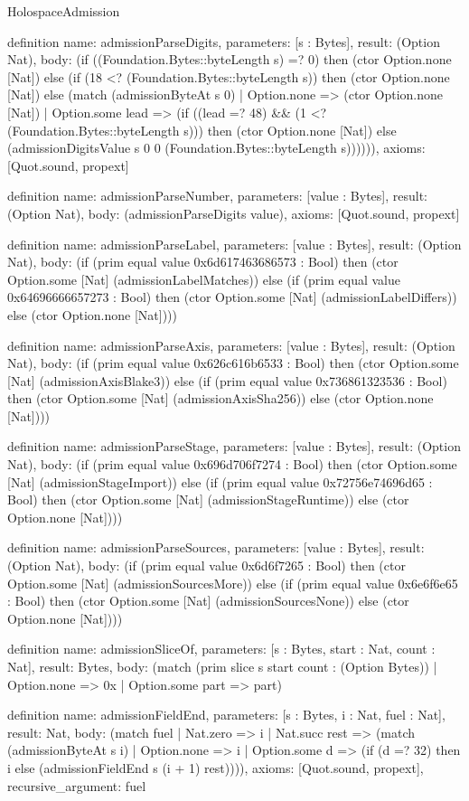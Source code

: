 \begin{lexlean}{HolospaceAdmission}
\begin{semanticmodule}
definition{
  name: admissionParseDigits,
  parameters: [s : Bytes],
  result: (Option Nat),
  body: (if ((Foundation.Bytes::byteLength s) =? 0) then (ctor Option.none [Nat]) else (if (18 <? (Foundation.Bytes::byteLength s)) then (ctor Option.none [Nat]) else (match (admissionByteAt s 0)
    | Option.none => (ctor Option.none [Nat])
    | Option.some lead => (if ((lead =? 48) && (1 <? (Foundation.Bytes::byteLength s))) then (ctor Option.none [Nat]) else (admissionDigitsValue s 0 0 (Foundation.Bytes::byteLength s)))))),
  axioms: [Quot.sound, propext]
}

definition{
  name: admissionParseNumber,
  parameters: [value : Bytes],
  result: (Option Nat),
  body: (admissionParseDigits value),
  axioms: [Quot.sound, propext]
}

definition{
  name: admissionParseLabel,
  parameters: [value : Bytes],
  result: (Option Nat),
  body: (if (prim equal value 0x6d617463686573 : Bool) then (ctor Option.some [Nat] (admissionLabelMatches)) else (if (prim equal value 0x64696666657273 : Bool) then (ctor Option.some [Nat] (admissionLabelDiffers)) else (ctor Option.none [Nat])))
}

definition{
  name: admissionParseAxis,
  parameters: [value : Bytes],
  result: (Option Nat),
  body: (if (prim equal value 0x626c616b6533 : Bool) then (ctor Option.some [Nat] (admissionAxisBlake3)) else (if (prim equal value 0x736861323536 : Bool) then (ctor Option.some [Nat] (admissionAxisSha256)) else (ctor Option.none [Nat])))
}

definition{
  name: admissionParseStage,
  parameters: [value : Bytes],
  result: (Option Nat),
  body: (if (prim equal value 0x696d706f7274 : Bool) then (ctor Option.some [Nat] (admissionStageImport)) else (if (prim equal value 0x72756e74696d65 : Bool) then (ctor Option.some [Nat] (admissionStageRuntime)) else (ctor Option.none [Nat])))
}

definition{
  name: admissionParseSources,
  parameters: [value : Bytes],
  result: (Option Nat),
  body: (if (prim equal value 0x6d6f7265 : Bool) then (ctor Option.some [Nat] (admissionSourcesMore)) else (if (prim equal value 0x6e6f6e65 : Bool) then (ctor Option.some [Nat] (admissionSourcesNone)) else (ctor Option.none [Nat])))
}

definition{
  name: admissionSliceOf,
  parameters: [s : Bytes, start : Nat, count : Nat],
  result: Bytes,
  body: (match (prim slice s start count : (Option Bytes))
    | Option.none => 0x
    | Option.some part => part)
}

definition{
  name: admissionFieldEnd,
  parameters: [s : Bytes, i : Nat, fuel : Nat],
  result: Nat,
  body: (match fuel
    | Nat.zero => i
    | Nat.succ rest => (match (admissionByteAt s i)
      | Option.none => i
      | Option.some d => (if (d =? 32) then i else (admissionFieldEnd s (i + 1) rest)))),
  axioms: [Quot.sound, propext],
  recursive_argument: fuel
}


\end{semanticmodule}
\end{lexlean}

